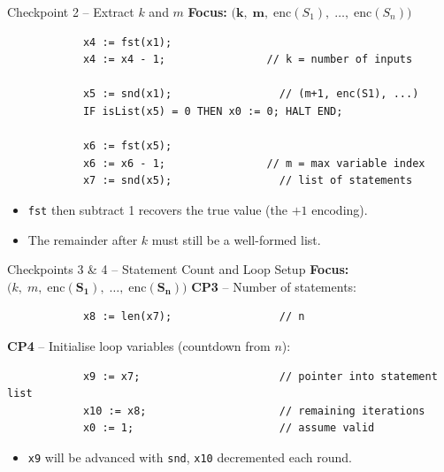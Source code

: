 \documentclass[aspectratio=169]{beamer}
\begin{document}
	\begin{frame}[fragile]{Checkpoint 2 – Extract $k$ and $m$}
		\textbf{Focus:} \(\bigl(\mathbf{k},\; \mathbf{m},\; \mathrm{enc}(S_1),\; \ldots,\; \mathrm{enc}(S_n)\bigr)\)
		\small
		\begin{verbatim}
			x4 := fst(x1);
			x4 := x4 - 1;                // k = number of inputs
			
			x5 := snd(x1);                 // (m+1, enc(S1), ...)
			IF isList(x5) = 0 THEN x0 := 0; HALT END;
			
			x6 := fst(x5);
			x6 := x6 - 1;                // m = max variable index
			x7 := snd(x5);                 // list of statements
		\end{verbatim}
		\vspace{-4pt}
		\begin{itemize}
			\item \texttt{fst} then subtract 1 recovers the true value (the $+1$ encoding).
			\item The remainder after $k$ must still be a well-formed list.
		\end{itemize}
	\end{frame}
	
	\begin{frame}[fragile]{Checkpoints 3 \& 4 – Statement Count and Loop Setup}
		\textbf{Focus:} \(\bigl(k,\; m,\; \mathbf{\mathrm{enc}(S_1),\; \ldots,\; \mathrm{enc}(S_n)}\bigr)\)
		\small
		\textbf{CP3} – Number of statements:
		\begin{verbatim}
			x8 := len(x7);                 // n
		\end{verbatim}
		
		\textbf{CP4} – Initialise loop variables (countdown from $n$):
		\begin{verbatim}
			x9 := x7;                      // pointer into statement list
			x10 := x8;                     // remaining iterations
			x0 := 1;                       // assume valid
		\end{verbatim}
		\begin{itemize}
			\item \texttt{x9} will be advanced with \texttt{snd}, \texttt{x10} decremented each round.
		\end{itemize}
	\end{frame}
	
\end{document}
